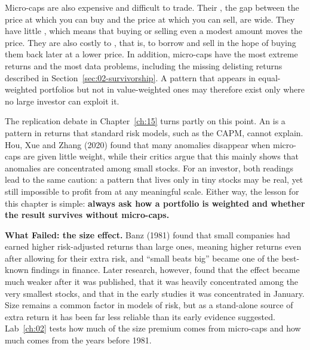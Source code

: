 Micro-caps are also expensive and difficult to trade. Their , the gap between the price at which you can buy and the price at which you can sell, are wide. They have little , which means that buying or selling even a modest amount moves the price. They are also costly to , that is, to borrow and sell in the hope of buying them back later at a lower price. In addition, micro-caps have the most extreme returns and the most data problems, including the missing delisting returns described in Section~\ref{sec:02-survivorship}. A pattern that appears in equal-weighted portfolios but not in value-weighted ones may therefore exist only where no large investor can exploit it.

The replication debate in Chapter~\ref{ch:15} turns partly on this point. An  is a pattern in returns that standard risk models, such as the CAPM, cannot explain. Hou, Xue and Zhang (2020) found that many anomalies disappear when micro-caps are given little weight, while their critics argue that this mainly shows that anomalies are concentrated among small stocks. For an investor, both readings lead to the same caution: a pattern that lives only in tiny stocks may be real, yet still impossible to profit from at any meaningful scale. Either way, the lesson for this chapter is simple: \textbf{always ask how a portfolio is weighted and whether the result survives without micro-caps.}

\begin{callout}
\textbf{What Failed: the size effect.} Banz (1981) found that small companies had earned higher risk-adjusted returns than large ones, meaning higher returns even after allowing for their extra risk, and ``small beats big'' became one of the best-known findings in finance. Later research, however, found that the effect became much weaker after it was published, that it was heavily concentrated among the very smallest stocks, and that in the early studies it was concentrated in January. Size remains a common factor in models of risk, but as a stand-alone source of extra return it has been far less reliable than its early evidence suggested. Lab~\ref{ch:02} tests how much of the size premium comes from micro-caps and how much comes from the years before 1981.
\end{callout}

